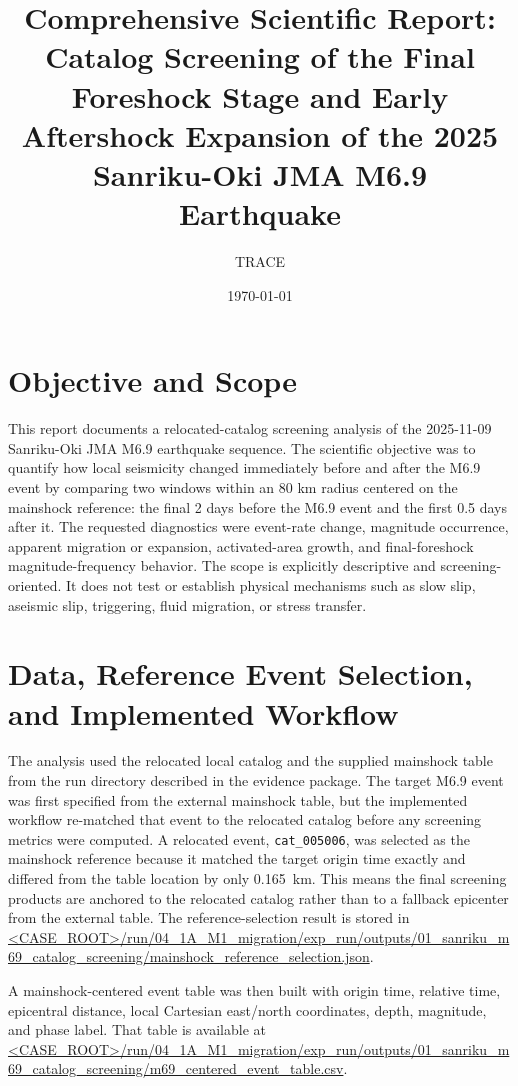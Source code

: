 \documentclass[11pt]{article}
\title{Comprehensive Scientific Report: Catalog Screening of the Final Foreshock Stage and Early Aftershock Expansion of the 2025 Sanriku-Oki JMA M6.9 Earthquake}
\author{TRACE}
\date{\today}
\begin{document}
\maketitle

\section{Objective and Scope}
This report documents a relocated-catalog screening analysis of the 2025-11-09 Sanriku-Oki JMA M6.9 earthquake sequence. The scientific objective was to quantify how local seismicity changed immediately before and after the M6.9 event by comparing two windows within an 80 km radius centered on the mainshock reference: the final 2 days before the M6.9 event and the first 0.5 days after it. The requested diagnostics were event-rate change, magnitude occurrence, apparent migration or expansion, activated-area growth, and final-foreshock magnitude-frequency behavior. The scope is explicitly descriptive and screening-oriented. It does not test or establish physical mechanisms such as slow slip, aseismic slip, triggering, fluid migration, or stress transfer.

\section{Data, Reference Event Selection, and Implemented Workflow}
The analysis used the relocated local catalog and the supplied mainshock table from the run directory described in the evidence package. The target M6.9 event was first specified from the external mainshock table, but the implemented workflow re-matched that event to the relocated catalog before any screening metrics were computed. A relocated event, \texttt{cat\_005006}, was selected as the mainshock reference because it matched the target origin time exactly and differed from the table location by only \SI{0.165}{km}. This means the final screening products are anchored to the relocated catalog rather than to a fallback epicenter from the external table. The reference-selection result is stored in \url{<CASE_ROOT>/run/04_1A_M1_migration/exp_run/outputs/01_sanriku_m69_catalog_screening/mainshock_reference_selection.json}.

A mainshock-centered event table was then built with origin time, relative time, epicentral distance, local Cartesian east/north coordinates, depth, magnitude, and phase label. That table is available at \url{<CASE_ROOT>/run/04_1A_M1_migration/exp_run/outputs/01_sanriku_m69_catalog_screening/m69_centered_event_table.csv}.
\end{document}
